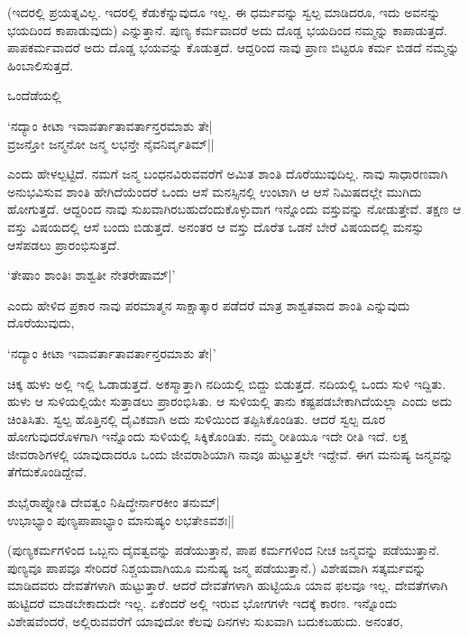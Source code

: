 (ಇದರಲ್ಲಿ ಪ್ರಯತ್ನವಿಲ್ಲ. ಇದರಲ್ಲಿ ಕೆಡುಕೆನ್ನುವುದೂ ಇಲ್ಲ. ಈ ಧರ್ಮವನ್ನು ಸ್ವಲ್ಪ ಮಾಡಿದರೂ, ಇದು ಅವನನ್ನು ಭಯದಿಂದ ಕಾಪಾಡುವುದು) ಎನ್ನುತ್ತಾನೆ. ಪುಣ್ಯ ಕರ್ಮವಾದರೆ ಅದು ದೊಡ್ಡ ಭಯದಿಂದ ನಮ್ಮನ್ನು ಕಾಪಾಡುತ್ತದೆ. ಪಾಪಕರ್ಮವಾದರೆ ಅದು ದೊಡ್ಡ ಭಯವನ್ನು ಕೊಡುತ್ತದೆ. ಆದ್ದರಿಂದ ನಾವು ಪ್ರಾಣ ಬಿಟ್ಟರೂ ಕರ್ಮ ಬಿಡದೆ ನಮ್ಮನ್ನು ಹಿಂಬಾಲಿಸುತ್ತದೆ.

ಒಂದೆಡೆಯಲ್ಲಿ

\begin{shloka}
`ನದ್ಯಾಂ ಕೀಟಾ ಇವಾವರ್ತಾತಾವರ್ತಾನ್ತರಮಾಶು ತೇ|\\
ವ್ರಜನ್ತೋ ಜನ್ಮನೋ ಜನ್ಮ ಲಭನ್ತೇ ನೈವನಿರ್ವೃತಿಮ್||
\end{shloka}

ಎಂದು ಹೇಳಲ್ಪಟ್ಟಿದೆ. ನಮಗೆ ಜನ್ಮ ಬಂಧನವಿರುವವರೆಗೆ ಅಮಿತ ಶಾಂತಿ ದೊರೆಯುವುದಿಲ್ಲ. ನಾವು ಸಾಧಾರಣವಾಗಿ ಅನುಭವಿಸುವ ಶಾಂತಿ ಹೇಗಿದೆಯೆಂದರೆ ಒಂದು ಆಸೆ ಮನಸ್ಸಿನಲ್ಲಿ ಉಂಟಾಗಿ ಆ ಆಸೆ ನಿಮಿಷದಲ್ಲೇ ಮುಗಿದು ಹೋಗುತ್ತದೆ. ಆದ್ದರಿಂದ ನಾವು ಸುಖವಾಗಿರಬಹುದೆಂದುಕೊಳ್ಳುವಾಗ ಇನ್ನೊಂದು ವಸ್ತುವನ್ನು ನೋಡುತ್ತೇವೆ. ತಕ್ಷಣ ಆ ವಸ್ತು ವಿಷಯದಲ್ಲಿ ಆಸೆ ಬಂದು ಬಿಡುತ್ತದೆ. ಅನಂತರ ಆ ವಸ್ತು ದೊರೆತ ಒಡನೆ ಬೇರೆ ವಿಷಯದಲ್ಲಿ ಮನಸ್ಸು ಆಸೆಪಡಲು ಪ್ರಾರಂಭಿಸುತ್ತದೆ.

\begin{shloka}
`ತೇಷಾಂ ಶಾಂತಿಃ ಶಾಶ್ವತೀ ನೇತರೇಷಾಮ್|'
\end{shloka}

ಎಂದು ಹೇಳಿದ ಪ್ರಕಾರ ನಾವು ಪರಮಾತ್ಮನ ಸಾಕ್ಷಾತ್ಕಾರ ಪಡೆದರೆ ಮಾತ್ರ ಶಾಶ್ವತವಾದ ಶಾಂತಿ ಎನ್ನುವುದು ದೊರೆಯುವುದು,

\begin{shloka}
`ನದ್ಯಾಂ ಕೀಟಾ ಇವಾವರ್ತಾತಾವರ್ತಾನ್ತರಮಾಶು ತೇ|'
\end{shloka}

ಚಿಕ್ಕ ಹುಳು ಅಲ್ಲಿ ಇಲ್ಲಿ ಓಡಾಡುತ್ತದೆ. ಅಕಸ್ಮಾತ್ತಾಗಿ ನದಿಯಲ್ಲಿ ಬಿದ್ದು ಬಿಡುತ್ತದೆ. ನದಿಯಲ್ಲಿ ಒಂದು ಸುಳಿ ಇದ್ದಿತು. ಹುಳು ಆ ಸುಳಿಯಲ್ಲಿಯೇ ಸುತ್ತಾಡಲು ಪ್ರಾರಂಭಿಸಿತು. ಆ ಸುಳಿಯಲ್ಲಿ ತಾನು ಕಷ್ಟಪಡಬೇಕಾಗಿದೆಯಲ್ಲಾ ಎಂದು ಅದು ಚಿಂತಿಸಿತು. ಸ್ವಲ್ಪ ಹೊತ್ತಿನಲ್ಲಿ ದೈವಿಕವಾಗಿ ಅದು ಸುಳಿಯಿಂದ ತಪ್ಪಿಸಿಕೊಂಡಿತು. ಆದರೆ ಸ್ವಲ್ಪ ದೂರ ಹೋಗುವುದರೊಳಗಾಗಿ ಇನ್ನೊಂದು ಸುಳಿಯಲ್ಲಿ ಸಿಕ್ಕಿಕೊಂಡಿತು. ನಮ್ಮ ರೀತಿಯೂ ಇದೇ ರೀತಿ ಇದೆ. {}ಲಕ್ಷ ಜೀವರಾಶಿಗಳಲ್ಲಿ ಯಾವುದಾದರೂ ಒಂದು ಜೀವರಾಶಿಯಾಗಿ ನಾವೂ ಹುಟ್ಟುತ್ತಲೇ ಇದ್ದೇವೆ. ಈಗ ಮನುಷ್ಯ ಜನ್ಮವನ್ನು ತೆಗೆದುಕೊಂಡಿದ್ದೇವೆ.

\begin{shloka}
ಶುಭೈರಾಪ್ನೋತಿ ದೇವತ್ವಂ ನಿಷಿದ್ಧೇರ್ನಾರಕೀಂ ತನುಮ್|\\
ಉಭಾಭ್ಯಾಂ ಪುಣ್ಯಪಾಪಾಭ್ಯಾಂ ಮಾನುಷ್ಯಂ ಲಭತೇಽವಶಃ||
\end{shloka}

(ಪುಣ್ಯಕರ್ಮಗಳಿಂದ ಒಬ್ಬನು ದೈವತ್ವವನ್ನು ಪಡೆಯುತ್ತಾನೆ, ಪಾಪ ಕರ್ಮಗಳಿಂದ ನೀಚ ಜನ್ಮವನ್ನು ಪಡೆಯುತ್ತಾನೆ. ಪುಣ್ಯವೂ ಪಾಪವೂ ಸೇರಿದರೆ ನಿಶ್ಚಯವಾಗಿಯೂ ಮನುಷ್ಯ ಜನ್ಮ ಪಡೆಯುತ್ತಾನೆ.) ವಿಶೇಷವಾಗಿ ಸತ್ಕರ್ಮವನ್ನು ಮಾಡಿದವರು ದೇವತೆಗಳಾಗಿ ಹುಟ್ಟುತ್ತಾರೆ. ಆದರೆ ದೇವತೆಗಳಾಗಿ ಹುಟ್ಟಿಯೂ ಯಾವ ಫಲವೂ ಇಲ್ಲ. ದೇವತೆಗಳಾಗಿ ಹುಟ್ಟಿದರೆ ಮಾಡಬೇಕಾದುದೇ ಇಲ್ಲ. ಏಕೆಂದರೆ ಅಲ್ಲಿ ಇರುವ ಭೋಗಗಳೇ ಇದಕ್ಕೆ ಕಾರಣ. ಇನ್ನೊಂದು ವಿಶೇಷವೆಂದರೆ, ಅಲ್ಲಿರುವವರೆಗೆ ಯಾವುದೋ ಕೆಲವು ದಿನಗಳು ಸುಖವಾಗಿ ಬದುಕಬಹುದು. ಅನಂತರ,

